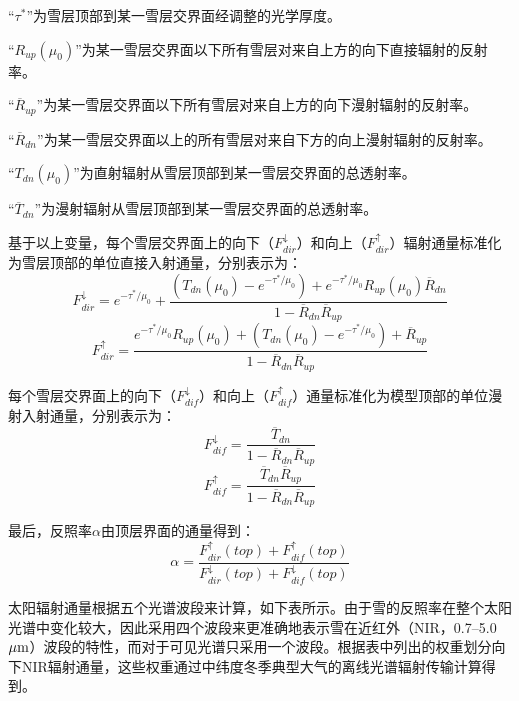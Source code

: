 ``$\tau^{*}$''为雪层顶部到某一雪层交界面经调整的光学厚度。

``$R_{up}\left( \mu_{0} \right)$''为某一雪层交界面以下所有雪层对来自上方的向下直接辐射的反射率。

``$\overline{R}_{up}$''为某一雪层交界面以下所有雪层对来自上方的向下漫射辐射的反射率。

``$\overline{R}_{dn}$''为某一雪层交界面以上的所有雪层对来自下方的向上漫射辐射的反射率。

``$T_{dn}\left( \mu_{0} \right)$''为直射辐射从雪层顶部到某一雪层交界面的总透射率。

``$\overline{T}_{dn}$''为漫射辐射从雪层顶部到某一雪层交界面的总透射率。

基于以上变量，每个雪层交界面上的向下（\(F_{dir}^{\downarrow}\)）和向上（\(F_{dir}^{\uparrow}\)）辐射通量标准化为雪层顶部的单位直接入射通量，分别表示为：
\begin{equation}
F_{dir}^{\downarrow} = e^{- \tau^{*}/\mu_{0}} + \frac{\left( T_{dn}\left( \mu_{0} \right) - e^{- \tau^{*}/\mu_{0}} \right) + e^{- \tau^{*}/\mu_{0}}R_{up}\left( \mu_{0} \right){\overline{R}}_{dn}}{1 - {\overline{R}}_{dn}{\overline{R}}_{up}}
\end{equation}
\begin{equation}
F_{dir}^{\uparrow} = \frac{e^{- \tau^{*}/\mu_{0}}R_{up}\left( \mu_{0} \right) + \left( T_{dn}\left( \mu_{0} \right) - e^{- \tau^{*}/\mu_{0}} \right) + {\overline{R}}_{up}}{1 - {\overline{R}}_{dn}{\overline{R}}_{up}}
\end{equation}

每个雪层交界面上的向下（\(F_{dif}^{\downarrow}\)）和向上（\(F_{dif}^{\uparrow}\)）通量标准化为模型顶部的单位漫射入射通量，分别表示为：
\begin{equation}
F_{dif}^{\downarrow} = \frac{{\overline{T}}_{dn}}{1 - {\overline{R}}_{dn}{\overline{R}}_{up}}
\end{equation}
\begin{equation}
F_{dif}^{\uparrow} = \frac{{\overline{T}}_{dn}{\overline{R}}_{up}}{1 - {\overline{R}}_{dn}{\overline{R}}_{up}}
\end{equation}

最后，反照率\(\alpha\)由顶层界面的通量得到：
\begin{equation}
\alpha = \frac{F_{dir}^{\uparrow}(top) + F_{dif}^{\uparrow}(top)}{F_{dir}^{\downarrow}(top) + F_{dif}^{\downarrow}(top)}
\end{equation}

太阳辐射通量根据五个光谱波段来计算，如下表所示。由于雪的反照率在整个太阳光谱中变化较大，因此采用四个波段来更准确地表示雪在近红外（NIR，0.7--5.0 $\mu \rm{m}$）波段的特性，而对于可见光谱只采用一个波段。根据表中列出的权重划分向下NIR辐射通量，这些权重通过中纬度冬季典型大气的离线光谱辐射传输计算得到\citep{briegleb2007delta}。

